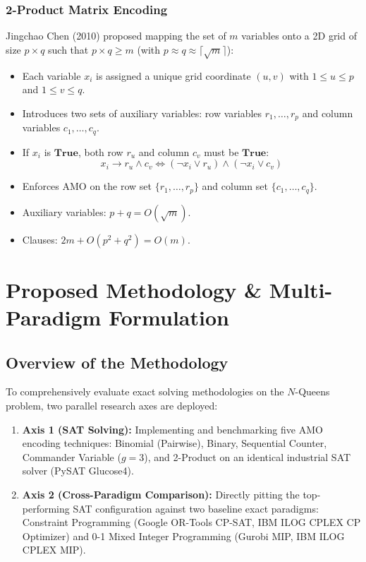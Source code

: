 \documentclass[a4paper,fleqn]{cas-sc}
\begin{document}
\subsubsection{2-Product Matrix Encoding}
Jingchao Chen (2010) \cite{chen2010new} proposed mapping the set of $m$ variables onto a 2D grid of size $p \times q$ such that $p \times q \ge m$ (with $p \approx q \approx \lceil \sqrt{m} \rceil$):
\begin{itemize}
    \item Each variable $x_i$ is assigned a unique grid coordinate $(u, v)$ with $1 \le u \le p$ and $1 \le v \le q$.
    \item Introduces two sets of auxiliary variables: row variables $r_1, \dots, r_p$ and column variables $c_1, \dots, c_q$.
    \item If $x_i$ is $\mathbf{True}$, both row $r_u$ and column $c_v$ must be $\mathbf{True}$:
    \begin{equation}
    x_i \to r_u \land c_v \iff (\neg x_i \lor r_u) \land (\neg x_i \lor c_v)
    \end{equation}
    \item Enforces AMO on the row set $\{r_1, \dots, r_p\}$ and column set $\{c_1, \dots, c_q\}$.
    \item Auxiliary variables: $p + q = O(\sqrt{m})$.
    \item Clauses: $2m + O(p^2 + q^2) = O(m)$.
\end{itemize}

\section{Proposed Methodology \& Multi-Paradigm Formulation}
\label{sec:methodology}

\subsection{Overview of the Methodology}
\label{subsec:method_overview}
To comprehensively evaluate exact solving methodologies on the $N$-Queens problem, two parallel research axes are deployed:
\begin{enumerate}
    \item \textbf{Axis 1 (SAT Solving):} Implementing and benchmarking five AMO encoding techniques: Binomial (Pairwise), Binary, Sequential Counter, Commander Variable ($g=3$), and 2-Product on an identical industrial SAT solver (PySAT Glucose4).
    \item \textbf{Axis 2 (Cross-Paradigm Comparison):} Directly pitting the top-performing SAT configuration against two baseline exact paradigms: Constraint Programming (Google OR-Tools CP-SAT, IBM ILOG CPLEX CP Optimizer) and 0-1 Mixed Integer Programming (Gurobi MIP, IBM ILOG CPLEX MIP).
\end{enumerate}
\end{document}
